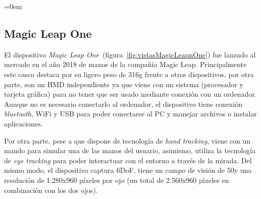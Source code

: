 \parindent=0em
\subsection{Magic Leap One}
\noindent

El dispositivo \textit{Magic Leap One}\footnotemark~(figura~\ref{fig:vistasMagicLeapnOne}) fue lanzado al mercado en el año 2018 de manos de la compañía Magic Leap. Principalmente este casco destaca por su ligero peso de 316g frente a otros dispositivos, por otra parte, son un HMD independiente ya que viene con un sistema (procesador y tarjeta gráfica) para no tener que ser usado mediante conexión con un ordenador. Aunque no es necesario conectarlo al ordenador, el dispositivo tiene conexión \textit{bluetooth}, WiFi y USB para poder conectarse al PC y manejar archivos o instalar aplicaciones.\\


Por otra parte, pese a que dispone de tecnología de \textit{hand tracking}, viene con un mando para simular una de las manos del usuario, asimismo, utiliza la tecnología de \textit{eye tracking} para poder interactuar con el entorno a través de la mirada. Del mismo modo, el dispositivo captura 6DoF, tiene un campo de visión de 50\degree  y una resolución de 1.280x960 píxeles por ojo (un total de 2.560x960 píxeles en combinación con los dos ojos).
 

